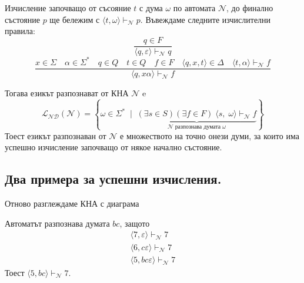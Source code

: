 \documentclass[12pt]{article}
\begin{document}
Изчисление започващо от съсояние \(t\) с дума \(\omega\) по автомата \(\mathcal{N}\), до финално състояние \(p\) ще бележим с \( \langle t, \omega  \rangle \vdash_\mathcal{N} p\).
Въвеждаме следните изчислителни правила:
\[ \displaystyle{\frac{q \in F}{ \langle q, \varepsilon  \rangle \vdash_\mathcal{N} q}} \]
\[ \displaystyle{\frac{
    x \in \Sigma \quad
    \alpha \in \Sigma^* \quad
    q \in Q \quad
    t \in Q \quad
    f \in F \quad
    \langle q, x, t \rangle \in \Delta \quad
    \langle t, \alpha \rangle \vdash_\mathcal{N} f
    }{ \langle q, x\alpha \rangle \vdash_\mathcal{N} f}} \]

Тогава езикът разпознават от КНА \(\mathcal{N}\) e
\[\mathcal{L_{ND}}(\mathcal{N}) = \left\{ \omega \in \Sigma^* \; \mid \;
\underbrace{(\exists s \in S)(\exists f \in F) \; \langle s, \; \omega \rangle \vdash_\mathcal{N} f }_{\mathcal{N} \; \text{разпознава думата} \; \omega}  \right\}\]
Тоест езикът разпознаван от \(\mathcal{N}\) е множеството на точно онези думи, за които има успешно изчисление започващо от някое начално състояние.

\subsection{Два примера за успешни изчисления.}
Отново разглеждаме КНА с диаграма

\begin{center}
\end{center}

Автоматът разпознава думата \(bc\), защото
\begin{align*}
    \langle 7, \varepsilon  \rangle \vdash_\mathcal{N} 7 \\
    \langle 6, c\varepsilon  \rangle \vdash_\mathcal{N} 7 \\
    \langle 5, bc\varepsilon  \rangle \vdash_\mathcal{N} 7
\end{align*}
Тоест \(\langle 5, bc  \rangle \vdash_\mathcal{N} 7\).
\end{document}

